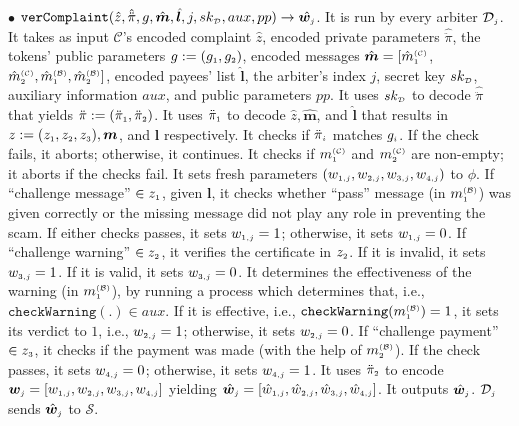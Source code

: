 \begin{definition}
\item  [$\bullet$] $\mathtt{verComplaint}( \hat z, \hat{\ddot{\pi}}, g, \hat{\bm m}, \hat{\bm{l}}, j, sk_{\scriptscriptstyle\mathcal D}, aux, pp)\rightarrow \hat{\bm{w}_{\scriptscriptstyle j}}$. It is run by every arbiter $\mathcal{D}_{\scriptscriptstyle  j}$. It takes as input  $\mathcal{C}$'s encoded complaint $\hat z$,  encoded private parameters $\hat{\ddot{\pi}}$,  the tokens' public parameters $g:=(g_{\scriptscriptstyle 1}, g_{\scriptscriptstyle 2})$,  encoded  messages $\hat{\bm m}=[\hat{m}_{\scriptscriptstyle 1}^{\scriptscriptstyle(\mathcal C)}$, $\hat{m}_{\scriptscriptstyle 2}^{\scriptscriptstyle(\mathcal C)}, \hat{m}_{\scriptscriptstyle 1}^{\scriptscriptstyle(\mathcal B)}, \hat{m}_{\scriptscriptstyle 2}^{\scriptscriptstyle(\mathcal B)}]$, encoded payees' list $ \hat{\bm{l}}$,  the  arbiter's index $j$, secret key $sk_{\scriptscriptstyle\mathcal D}$,   auxiliary information $aux$, and public parameters $pp$.  It uses $sk_{\scriptscriptstyle\mathcal D}$ to decode $\hat{\ddot{\pi}}$ that yields  $\ddot{\pi}:=(\ddot{\pi}_{\scriptscriptstyle 1}, \ddot{\pi}_{\scriptscriptstyle 2})$. It uses $\ddot{\pi}_{\scriptscriptstyle 1}$ to decode  $\hat z,  \hat{\bm{m}}$, and  $\hat{\bm{l}}$ that results in $z:=(z_{\scriptscriptstyle 1}, z_{\scriptscriptstyle 2}, z_{\scriptscriptstyle 3}), {\bm m}$, and  ${\bm{l}}$ respectively.  It checks if $\ddot{\pi}_{\scriptscriptstyle i}$ matches  $g_{\scriptscriptstyle i}$. If the check fails, it aborts; otherwise, it continues.  It  checks  if ${m}_{\scriptscriptstyle 1}^{\scriptscriptstyle(\mathcal C)}$ and ${m}_{\scriptscriptstyle 2}^{\scriptscriptstyle(\mathcal C)}$ are non-empty; it aborts if the checks fail. It  sets  fresh parameters $(w_{\scriptscriptstyle 1,j}, w_{\scriptscriptstyle 2,j},  w_{\scriptscriptstyle 3,j},   w_{\scriptscriptstyle 4,j})$ to $\phi$. If ``challenge message'' $\in z_{\scriptscriptstyle 1}$, given $\bm l$,  it checks whether  ``pass''  message (in ${m}^{\scriptscriptstyle\mathcal{(B)}}_{\scriptscriptstyle1}$) was given correctly or the missing message did not play any role in preventing the scam.  If either checks passes, it sets  $w_{\scriptscriptstyle 1,j}=1$;  otherwise,  it sets $w_{\scriptscriptstyle 1,j}=0$. If ``challenge warning'' $\in z_{\scriptscriptstyle 2}$,   it verifies  the certificate in $z_{\scriptscriptstyle 2}$.  If it is invalid,  it sets $ w_{\scriptscriptstyle 3,j}=1$.  If it is valid, it sets  $w_{\scriptscriptstyle 3,j}=0$. It  determines the effectiveness of the warning (in ${m}^{\scriptscriptstyle\mathcal{(B)}}_{\scriptscriptstyle1}$), by running a process which  determines that, i.e., $\mathtt{checkWarning}(.)\in aux$. If  it is effective, i.e., $\mathtt{checkWarning}({m}^{\scriptscriptstyle\mathcal{(B)}}_{\scriptscriptstyle1})= 1$,  it sets its verdict to $1$, i.e., $w_{\scriptscriptstyle 2,j}=1$; otherwise, it sets $w_{\scriptscriptstyle 2,j}=0$.  If ``challenge payment'' $\in z_{\scriptscriptstyle 3}$,    it checks if the payment was made (with the help of ${m}_{\scriptscriptstyle 2}^{\scriptscriptstyle(\mathcal B)}$). If the check passes,  it sets $w_{\scriptscriptstyle 4,j}=0$; otherwise, it sets $w_{\scriptscriptstyle 4,j}=1$.  It uses $\ddot \pi_{\scriptscriptstyle 2}$ to encode  $\bm{w}_{\scriptscriptstyle j} = [w_{\scriptscriptstyle 1,j}, w_{\scriptscriptstyle 2, j}, w_{\scriptscriptstyle 3, j}, w_{\scriptscriptstyle 4, j}]$ yielding  $\hat{\bm{w}}_{\scriptscriptstyle j}= [\hat {w}_{\scriptscriptstyle 1,j}, \hat{w}_{\scriptscriptstyle 2, j}, \hat{w}_{\scriptscriptstyle 3, j}, \hat{w}_{\scriptscriptstyle 4, j}]$. It outputs $\hat{\bm{w}}_{\scriptscriptstyle j}$. $\mathcal{D}_{\scriptscriptstyle  j}$ sends $\hat{\bm{w}}_{\scriptscriptstyle j}$ to  $\mathcal{S}$. 

\end{definition}
